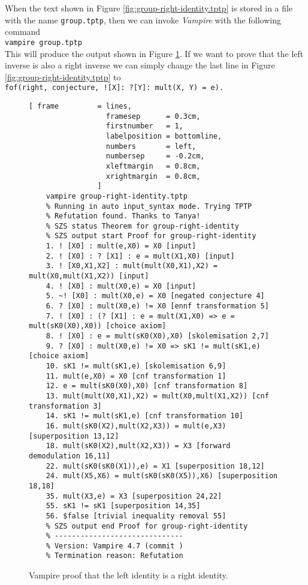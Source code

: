 When the text shown in Figure \ref{fig:group-right-identity.tptp} is stored in a file with the name \texttt{group.tptp},
then we can invoke \textsl{Vampire} with the following command
\\[0.2cm]
\hspace*{1.3cm}
\texttt{vampire group.tptp}
\\[0.2cm]
This will produce the output shown in Figure \ref{fig:group-right-identity.output}.  If we want to prove that
the left inverse is also a right inverse we can simply change the last line in Figure
\ref{fig:group-right-identity.tptp} to
\\[0.2cm]
\hspace*{1.3cm}
\texttt{fof(right, conjecture, ![X]: ?[Y]: mult(X, Y) = e).}


\begin{figure}[!ht]
\centering
\begin{Verbatim}[ frame         = lines, 
                  framesep      = 0.3cm, 
                  firstnumber   = 1,
                  labelposition = bottomline,
                  numbers       = left,
                  numbersep     = -0.2cm,
                  xleftmargin   = 0.8cm,
                  xrightmargin  = 0.8cm,
                ]
    vampire group-right-identity.tptp
    % Running in auto input_syntax mode. Trying TPTP
    % Refutation found. Thanks to Tanya!
    % SZS status Theorem for group-right-identity
    % SZS output start Proof for group-right-identity
    1. ! [X0] : mult(e,X0) = X0 [input]
    2. ! [X0] : ? [X1] : e = mult(X1,X0) [input]
    3. ! [X0,X1,X2] : mult(mult(X0,X1),X2) = mult(X0,mult(X1,X2)) [input]
    4. ! [X0] : mult(X0,e) = X0 [input]
    5. ~! [X0] : mult(X0,e) = X0 [negated conjecture 4]
    6. ? [X0] : mult(X0,e) != X0 [ennf transformation 5]
    7. ! [X0] : (? [X1] : e = mult(X1,X0) => e = mult(sK0(X0),X0)) [choice axiom]
    8. ! [X0] : e = mult(sK0(X0),X0) [skolemisation 2,7]
    9. ? [X0] : mult(X0,e) != X0 => sK1 != mult(sK1,e) [choice axiom]
    10. sK1 != mult(sK1,e) [skolemisation 6,9]
    11. mult(e,X0) = X0 [cnf transformation 1]
    12. e = mult(sK0(X0),X0) [cnf transformation 8]
    13. mult(mult(X0,X1),X2) = mult(X0,mult(X1,X2)) [cnf transformation 3]
    14. sK1 != mult(sK1,e) [cnf transformation 10]
    16. mult(sK0(X2),mult(X2,X3)) = mult(e,X3) [superposition 13,12]
    18. mult(sK0(X2),mult(X2,X3)) = X3 [forward demodulation 16,11]
    22. mult(sK0(sK0(X1)),e) = X1 [superposition 18,12]
    24. mult(X5,X6) = mult(sK0(sK0(X5)),X6) [superposition 18,18]
    35. mult(X3,e) = X3 [superposition 24,22]
    55. sK1 != sK1 [superposition 14,35]
    56. $false [trivial inequality removal 55]
    % SZS output end Proof for group-right-identity
    % ------------------------------
    % Version: Vampire 4.7 (commit )
    % Termination reason: Refutation
\end{Verbatim} 
\vspace*{-0.3cm}
\caption{Vampire proof that the left identity is a right identity.}
\label{fig:group-right-identity.output} %
\end{figure}

